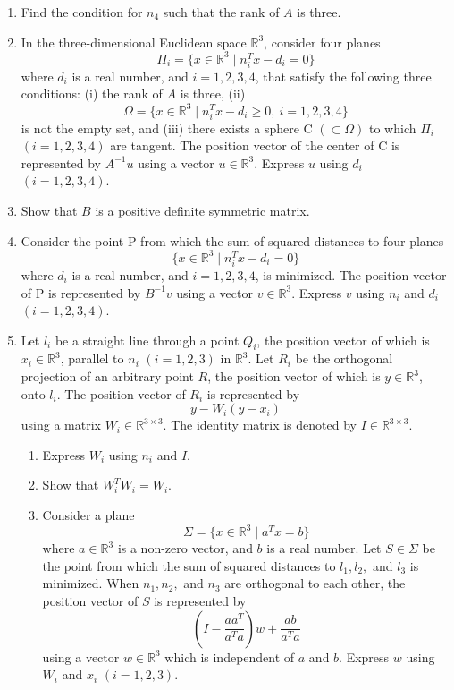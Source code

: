 \documentclass[10pt,a4paper]{article}
\begin{document}
\begin{enumerate}
  \item Find the condition for $n_4$ such that the rank of $A$ is three.

  \item In the three-dimensional Euclidean space $\mathbb{R}^3$, consider four planes
        \[
          \Pi_i=\{x\in\mathbb{R}^3\mid n_i^Tx-d_i=0\}
        \]
        where $d_i$ is a real number, and $i=1,2,3,4$, that satisfy the following three conditions: (i) the rank of $A$ is three, (ii)
        \[
          \Omega=\{x\in\mathbb{R}^3\mid n_i^Tx-d_i\geq 0,\ i=1,2,3,4\}
        \]
        is not the empty set, and (iii) there exists a sphere C $(\subset\Omega)$ to which $\Pi_i$ $(i=1,2,3,4)$ are tangent. The position vector of the center of C is represented by $A^{-1}u$ using a vector $u\in\mathbb{R}^3$. Express $u$ using $d_i$ $(i=1,2,3,4)$.

  \item Show that $B$ is a positive definite symmetric matrix.

  \item Consider the point P from which the sum of squared distances to four planes
        \[
          \{x\in\mathbb{R}^3\mid n_i^Tx-d_i=0\}
        \]
        where $d_i$ is a real number, and $i=1,2,3,4$, is minimized. The position vector of P is represented by $B^{-1}v$ using a vector $v\in\mathbb{R}^3$. Express $v$ using $n_i$ and $d_i$ $(i=1,2,3,4)$.

  \item Let $l_i$ be a straight line through a point $Q_i$, the position vector of which is $x_i\in\mathbb{R}^3$, parallel to $n_i$ $(i=1,2,3)$ in $\mathbb{R}^3$. Let $R_i$ be the orthogonal projection of an arbitrary point $R$, the position vector of which is $y\in\mathbb{R}^3$, onto $l_i$. The position vector of $R_i$ is represented by
        \[
          y-W_i(y-x_i)
        \]
        using a matrix $W_i\in\mathbb{R}^{3\times 3}$. The identity matrix is denoted by $I\in\mathbb{R}^{3\times 3}$.
        \begin{enumerate}
          \item Express $W_i$ using $n_i$ and $I$.
          \item Show that $W_i^TW_i=W_i$.
          \item Consider a plane
                \[
                  \Sigma=\{x\in\mathbb{R}^3\mid a^Tx=b\}
                \]
                where $a\in\mathbb{R}^3$ is a non-zero vector, and $b$ is a real number. Let $S\in\Sigma$ be the point from which the sum of squared distances to $l_1,l_2,$ and $l_3$ is minimized. When $n_1,n_2,$ and $n_3$ are orthogonal to each other, the position vector of $S$ is represented by
                \[
                  \left(I-\frac{aa^T}{a^Ta}\right)w+\frac{ab}{a^Ta}
                \]
                using a vector $w\in\mathbb{R}^3$ which is independent of $a$ and $b$. Express $w$ using $W_i$ and $x_i$ $(i=1,2,3)$.
        \end{enumerate}
\end{enumerate}
\end{document}
